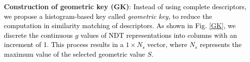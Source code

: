 \documentclass[letterpaper, 10 pt, conference]{ieeeconf}   %
\newcommand\kevin[1]{\textcolor{black}{#1}}
\begin{document}




\textbf{Construction of geometric key (GK)}: \kevin{Instead of using complete descriptors, we propose a histogram-based key called \emph{geometric key}, to reduce the computation in similarity matching of descriptors. 
As shown in Fig. \ref{GK}, we discrete the continuous $g$ values of NDT representations into columns with an increment of 1. This process results in a $1 \times N_s$ vector, where $N_s$ represents the maximum value of the selected geometric value $S$.}
\end{document}
